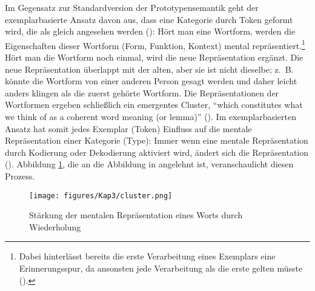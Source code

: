 Im Gegensatz zur Standardversion der Prototypensemantik geht der exemplarbasierte Ansatz davon aus, dass eine Kategorie durch Token geformt wird, die als gleich angesehen werden (\cite[53]{Bybee.2013}): Hört man eine Wortform, werden die Eigenschaften dieser Wortform (Form, Funktion, Kontext) mental repräsentiert.\footnote{Dabei hinterlässt bereits die erste Verarbeitung eines Exemplars eine Erinnerungsspur, da ansonsten jede Verarbeitung als die erste gelten müsste (\cites[722--723]{Bybee.2006b}[56]{Bybee.2013}[13--14, 54]{Goldberg.2019}).} Hört man die Wortform noch einmal, wird die neue Repräsentation ergänzt. Die neue Repräsentation überlappt mit der alten, aber sie ist nicht dieselbe; z.~B. könnte die Wortform von einer anderen Person gesagt werden und daher leicht anders klingen als die zuerst gehörte Wortform. Die Repräsentationen der Wortformen ergeben schließlich ein emergentes Cluster, "`which constitutes what we think of as a coherent word meaning (or lemma)"' (\cite[16]{Goldberg.2019}). Im exemplarbasierten Ansatz hat somit jedes Exemplar (Token) Einfluss auf die mentale Repräsentation einer Kategorie (Type): Immer wenn eine mentale Repräsentation durch Kodierung oder Dekodierung aktiviert wird, ändert sich die Repräsentation (\cites[722]{Bybee.2006b}[52]{Bybee.2013}[51--52]{Goldberg.2019}). Abbildung \ref{cluster}, die an die Abbildung in \textcite[16]{Goldberg.2019} angelehnt ist, veranschaulicht diesen Prozess.\largerpage[2]

\begin{figure}
\texttt{[image: figures/Kap3/cluster.png]}  
\caption{Stärkung der mentalen Repräsentation eines Worts durch Wiederholung}
\label{cluster}
\end{figure}

